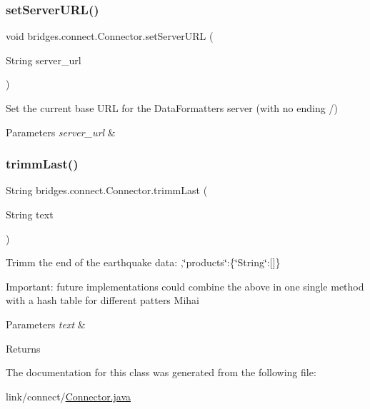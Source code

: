 \subsubsection{\texorpdfstring{set\+Server\+U\+R\+L()}{setServerURL()}}
{\footnotesize\ttfamily void bridges.\+connect.\+Connector.\+set\+Server\+U\+RL (\begin{DoxyParamCaption}\item[{String}]{server\+\_\+url }\end{DoxyParamCaption})}

Set the current base U\+RL for the Data\+Formatters server (with no ending /) 
\begin{DoxyParams}{Parameters}
{\em server\+\_\+url} & \\
\hline
\end{DoxyParams}
\hypertarget{classbridges_1_1connect_1_1_connector_ac0dca0bd99b6abbbd8a77874a95e6d49}{}\label{classbridges_1_1connect_1_1_connector_ac0dca0bd99b6abbbd8a77874a95e6d49} 
\subsubsection{\texorpdfstring{trimm\+Last()}{trimmLast()}}
{\footnotesize\ttfamily String bridges.\+connect.\+Connector.\+trimm\+Last (\begin{DoxyParamCaption}\item[{String}]{text }\end{DoxyParamCaption})}

Trimm the end of the earthquake data\+: ,\char`\"{}products\char`\"{}\+:\{\char`\"{}\+String\char`\"{}\+:\mbox{[}\mbox{]}\}

Important\+: future implementations could combine the above in one single method with a hash table for different patters Mihai 
\begin{DoxyParams}{Parameters}
{\em text} & \\
\hline
\end{DoxyParams}
\begin{DoxyReturn}{Returns}

\end{DoxyReturn}


The documentation for this class was generated from the following file\+:\begin{DoxyCompactItemize}
\item 
link/connect/\hyperlink{_connector_8java}{Connector.\+java}\end{DoxyCompactItemize}
